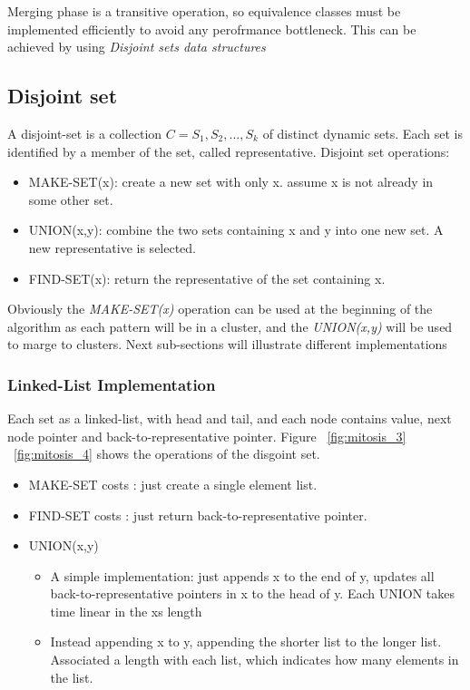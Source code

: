 Merging phase is a transitive operation, so equivalence classes must be implemented efficiently to avoid any perofrmance bottleneck.
This can be achieved by using \textit{Disjoint sets data structures}
\subsection{Disjoint set}

A disjoint-set is a collection $C={S_1, S_2,..., S_k}$ of distinct dynamic sets.
Each set is identified by a member of the set, called representative.
Disjoint set operations:
\begin{itemize}
\item MAKE-SET(x): create a new set with only x. assume x is not already in some other set.
\item UNION(x,y): combine the two sets containing x and y into one new set. A new representative is selected.
\item FIND-SET(x): return the representative of the set containing x.
\end{itemize}
Obviously the \textit{MAKE-SET(x)} operation can be used at the beginning of the algorithm as each pattern will be in a cluster, and the \textit{UNION(x,y)} will be used to marge to clusters.
Next sub-sections will illustrate different implementations
\subsubsection{Linked-List Implementation}
Each set as a linked-list, with head and tail, and each node contains value, next node pointer and back-to-representative pointer.
Figure ~\ref{fig:mitosis_3} ~\ref{fig:mitosis_4} shows the operations of the disgoint set.
\begin{itemize}
\item MAKE-SET costs : just create a single element list.
\item FIND-SET costs : just return back-to-representative pointer.
\item {UNION(x,y) 
\begin{itemize}
\item {A simple implementation: just appends x to the end of y, updates all back-to-representative pointers in x to the head of y.
Each UNION takes time linear in the xs length}
\item {Instead appending x to y, appending the shorter list to the longer list.
Associated a length with each list, which indicates how many elements in the list.
}
\end{itemize}
}
\end{itemize}

